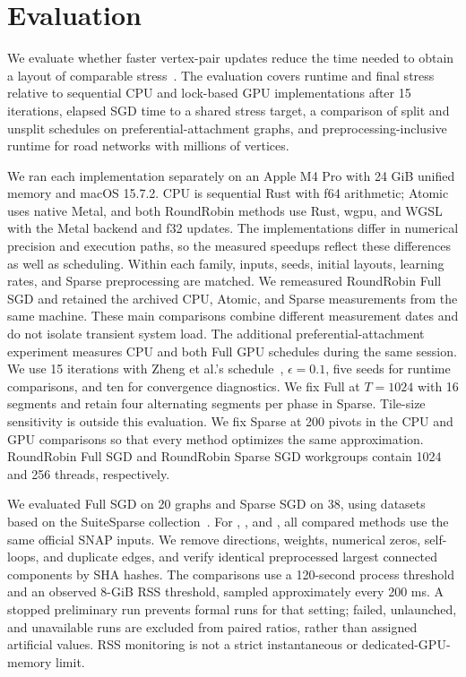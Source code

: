 \section{Evaluation}
\label{sec:evaluation}
We evaluate whether faster vertex-pair updates reduce the time needed to obtain a layout of comparable stress~\cite{ref46}. The evaluation covers runtime and final stress relative to sequential CPU and lock-based GPU implementations after 15 iterations, elapsed SGD time to a shared stress target, a comparison of split and unsplit schedules on preferential-attachment graphs, and preprocessing-inclusive runtime for road networks with millions of vertices.

We ran each implementation separately on an Apple M4 Pro with 24 GiB unified memory and macOS 15.7.2.
CPU is sequential Rust with f64 arithmetic; Atomic uses native Metal, and both RoundRobin methods use Rust, wgpu, and WGSL~\cite{ref31} with the Metal backend and f32 updates.
The implementations differ in numerical precision and execution paths, so the measured speedups reflect these differences as well as scheduling.
Within each family, inputs, seeds, initial layouts, learning rates, and Sparse preprocessing are matched.
We remeasured RoundRobin Full SGD and retained the archived CPU, Atomic, and Sparse measurements from the same machine. These main comparisons combine different measurement dates and do not isolate transient system load. The additional preferential-attachment experiment measures CPU and both Full GPU schedules during the same session.
We use 15 iterations with Zheng et al.'s schedule~\cite{ref28}, $\epsilon=0.1$, five seeds for runtime comparisons, and ten for convergence diagnostics.
We fix Full at $T=1024$ with 16 segments and retain four alternating segments per phase in Sparse. Tile-size sensitivity is outside this evaluation.
We fix Sparse at 200 pivots in the CPU and GPU comparisons so that every method optimizes the same approximation. RoundRobin Full SGD and RoundRobin Sparse SGD workgroups contain 1024 and 256 threads, respectively.

We evaluated Full SGD on 20 graphs and Sparse SGD on 38, using datasets based on the SuiteSparse collection~\cite{ref6}.
For , , and , all compared methods use the same official SNAP inputs.
We remove directions, weights, numerical zeros, self-loops, and duplicate edges, and verify identical preprocessed largest connected components by SHA hashes.
The comparisons use a 120-second process threshold and an observed 8-GiB RSS threshold, sampled approximately every 200 ms.
A stopped preliminary run prevents formal runs for that setting; failed, unlaunched, and unavailable runs are excluded from paired ratios, rather than assigned artificial values.
RSS monitoring is not a strict instantaneous or dedicated-GPU-memory limit.

